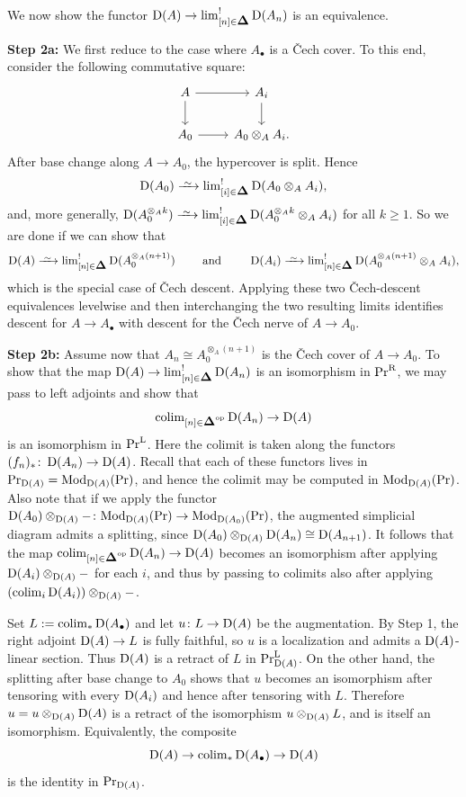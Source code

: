\documentclass[11pt]{book}
\begin{document}
	We now show the functor $\D(A) \to \lim_{[n] \in \simp}^! \D(A_n)$ is an equivalence.

	\textbf{Step 2a:} We first reduce to the case where $A_{\bullet}$ is a \v{C}ech cover. To this end, consider the following commutative square:
	\[
		\begin{tikzcd}
			A \rar \dar & A_i \dar \\
			A_0 \rar & A_0 \otimes_A A_i.
		\end{tikzcd}
	\]
	After base change along $A \to A_0$, the hypercover is split. Hence
	\[
		\D(A_0) \iso \lim^!_{[i] \in \simp} \D(A_0 \otimes_A A_i),
	\]
	and, more generally, $\D(A_0^{\otimes_A k}) \iso \lim^!_{[i] \in \simp} \D(A_0^{\otimes_A k} \otimes_A A_i)$ for all $k \geq 1$. So we are done if we can show that
	\[
		\D(A) \iso \lim^!_{[n] \in \simp} \D(A_0^{\otimes_A (n+1)}) \qquad \text{ and } \qquad \D(A_i) \iso \lim^!_{[n] \in \simp} \D(A_0^{\otimes_A (n+1)} \otimes_A A_i),
	\]
	which is the special case of \v{C}ech descent. Applying these two \v{C}ech-descent equivalences levelwise and then interchanging the two resulting limits identifies descent for $A \to A_{\bullet}$ with descent for the \v{C}ech nerve of $A \to A_0$.

	\textbf{Step 2b:} Assume now that $A_n \cong A_0^{\otimes_A (n+1)}$ is the \v{C}ech cover of $A \to A_0$. To show that the map $\D(A) \to \lim_{[n] \in \simp}^! \D(A_n)$ is an isomorphism in $\textup{Pr}^{\textup{R}}$, we may pass to left adjoints and show that
	\[
		\colim_{[n] \in \simp\catop} \D(A_n) \to \D(A)
	\]
	is an isomorphism in $\textup{Pr}^{\textup{L}}$. Here the colimit is taken along the functors $(f_n)_*\colon \operatorname{\mathrm{D}}(A_n) \to \operatorname{\mathrm{D}}(A)$. Recall that each of these functors lives in $\textup{Pr}_{\operatorname{\mathrm{D}}(A)} = {\textup{Mod}}_{\operatorname{\mathrm{D}}(A)}(\textup{Pr})$, and hence the colimit may be computed in ${\textup{Mod}}_{\operatorname{\mathrm{D}}(A)}(\textup{Pr})$. Also note that if we apply the functor $\operatorname{\mathrm{D}}(A_0) \otimes_{\operatorname{\mathrm{D}}(A)} -\colon {\textup{Mod}}_{\operatorname{\mathrm{D}}(A)}(\textup{Pr}) \to {\textup{Mod}}_{\operatorname{\mathrm{D}}(A_0)}(\textup{Pr})$, the augmented simplicial diagram admits a splitting, since $\operatorname{\mathrm{D}}(A_0) \otimes_{\operatorname{\mathrm{D}}(A)} \operatorname{\mathrm{D}}(A_n) \cong \operatorname{\mathrm{D}}(A_{n+1})$. It follows that the map $\colim_{[n] \in \simp\catop} \D(A_n) \to \D(A)$ becomes an isomorphism after applying $\operatorname{\mathrm{D}}(A_i) \otimes_{\operatorname{\mathrm{D}}(A)} -$ for each $i$, and thus by passing to colimits also after applying $(\operatorname{colim}_i \operatorname{\mathrm{D}}(A_i)) \otimes_{\operatorname{\mathrm{D}}(A)} -$.

	Set $L := \operatorname{colim}_* \operatorname{\mathrm{D}}(A_{\bullet})$ and let $u\colon L \to \operatorname{\mathrm{D}}(A)$ be the augmentation. By Step 1, the right adjoint $\operatorname{\mathrm{D}}(A) \to L$ is fully faithful, so $u$ is a localization and admits a $\operatorname{\mathrm{D}}(A)$-linear section. Thus $\operatorname{\mathrm{D}}(A)$ is a retract of $L$ in $\textup{Pr}^{\textup{L}}_{\operatorname{\mathrm{D}}(A)}$. On the other hand, the splitting after base change to $A_0$ shows that $u$ becomes an isomorphism after tensoring with every $\operatorname{\mathrm{D}}(A_i)$ and hence after tensoring with $L$. Therefore $u = u \otimes_{\operatorname{\mathrm{D}}(A)} \operatorname{\mathrm{D}}(A)$ is a retract of the isomorphism $u \otimes_{\operatorname{\mathrm{D}}(A)} L$, and is itself an isomorphism. Equivalently, the composite
	\[
		\operatorname{\mathrm{D}}(A) \to \operatorname{colim}_* \operatorname{\mathrm{D}}(A_{\bullet}) \to \operatorname{\mathrm{D}}(A)
	\]
	is the identity in $\textup{Pr}_{\operatorname{\mathrm{D}}(A)}$.
\end{document}
